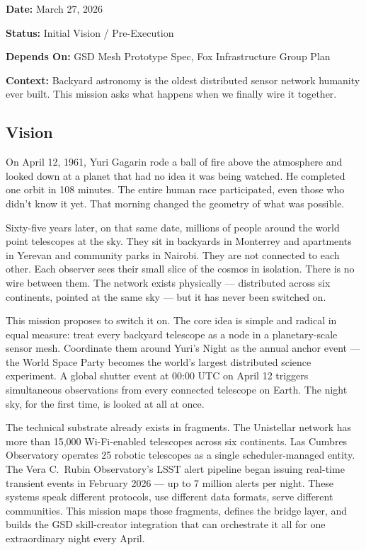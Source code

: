 \documentclass[11pt,letterpaper]{article}
\newcommand{\metafield}[2]{\textbf{\sffamily #1} #2\par}
\begin{document}
\metafield{Date:}{March 27, 2026}
\metafield{Status:}{Initial Vision / Pre-Execution}
\metafield{Depends On:}{GSD Mesh Prototype Spec, Fox Infrastructure Group Plan}
\metafield{Context:}{Backyard astronomy is the oldest distributed sensor network humanity ever built. This mission asks what happens when we finally wire it together.}

\subsection{Vision}

On April 12, 1961, Yuri Gagarin rode a ball of fire above the atmosphere and looked down at a planet that had no idea it was being watched. He completed one orbit in 108 minutes. The entire human race participated, even those who didn't know it yet. That morning changed the geometry of what was possible.

Sixty-five years later, on that same date, millions of people around the world point telescopes at the sky. They sit in backyards in Monterrey and apartments in Yerevan and community parks in Nairobi. They are not connected to each other. Each observer sees their small slice of the cosmos in isolation. There is no wire between them. The network exists physically --- distributed across six continents, pointed at the same sky --- but it has never been switched on.

This mission proposes to switch it on. The core idea is simple and radical in equal measure: treat every backyard telescope as a node in a planetary-scale sensor mesh. Coordinate them around Yuri's Night as the annual anchor event --- the World Space Party becomes the world's largest distributed science experiment. A global shutter event at 00:00 UTC on April 12 triggers simultaneous observations from every connected telescope on Earth. The night sky, for the first time, is looked at all at once.

The technical substrate already exists in fragments. The Unistellar network has more than 15,000 Wi-Fi-enabled telescopes across six continents. Las Cumbres Observatory operates 25 robotic telescopes as a single scheduler-managed entity. The Vera C.\ Rubin Observatory's LSST alert pipeline began issuing real-time transient events in February 2026 --- up to 7 million alerts per night. These systems speak different protocols, use different data formats, serve different communities. This mission maps those fragments, defines the bridge layer, and builds the GSD skill-creator integration that can orchestrate it all for one extraordinary night every April.
\end{document}

